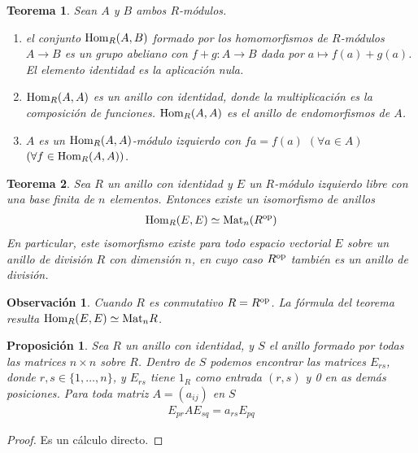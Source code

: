 \documentclass{report}
\newcommand{\Hom}{\textnormal{Hom}}
\newcommand{\Mat}{\textnormal{Mat}}
\newtheorem{theorem}{Teorema}
\newtheorem{proposition}{Proposición}
\newtheorem{remark}{Observación}
\begin{document}
  \begin{theorem}
    Sean \(A\) y \(B\) ambos \(R\)-módulos.
    \begin{enumerate}
      \item el conjunto \(\Hom_R(A, B)\) formado por los homomorfismos de \(R\)-módulos \(A \rightarrow B\) es un grupo abeliano con \(f + g : A \rightarrow B\) dada por \(a \mapsto f(a) + g(a)\).
      El elemento identidad es la aplicación nula.
      \item \(\Hom_R(A, A)\) es un anillo con identidad, donde la multiplicación es la composición de funciones.
      \(\Hom_R(A, A)\) es el \emph{anillo de endomorfismos} de \(A\).
      \item \(A\) es un \(\Hom_R(A, A)\)-módulo izquierdo con \(f a = f(a)\) \((\forall a \in A)\) \((\forall f \in \Hom_R(A, A))\).
    \end{enumerate}
  \end{theorem}

  \begin{theorem}
    Sea \(R\) un anillo con identidad y \(E\) un \(R\)-módulo izquierdo libre con una base finita de \(n\) elementos.
    Entonces existe un isomorfismo de anillos
    \begin{align}
      \Hom_R(E, E)
      \simeq
      \Mat_n(R^{\textnormal{op}})
    \end{align}
    En particular, este isomorfismo existe para todo espacio vectorial \(E\) sobre un anillo de división \(R\) con dimensión \(n\), en cuyo caso \(R^{\textnormal{op}}\) también es un anillo de división.
  \end{theorem}
  \begin{remark}
    Cuando \(R\) es conmutativo \(R = R^{\textnormal{op}}\).
    La fórmula del teorema resulta \(\Hom_R(E, E) \simeq \Mat_n R\).
  \end{remark}

  \begin{proposition}
    Sea \(R\) un anillo con identidad, y \(S\) el anillo formado por todas las matrices \(n \times n\) sobre \(R\).
    Dentro de \(S\) podemos encontrar las matrices \(E_{r s}\), donde \(r, s \in \{1, \dots, n\}\), y \(E_{r s}\) tiene \(1_R\) como entrada \((r, s)\) y 0 en as demás posiciones.
    Para toda matriz \(A = (a_{i j})\) en \(S\)
    \begin{align}
      E_{p r} A E_{s q}
      =
      a_{r s} E_{p q}
    \end{align}
  \end{proposition}
  \begin{proof}
    Es un cálculo directo.
  \end{proof}
\end{document}
